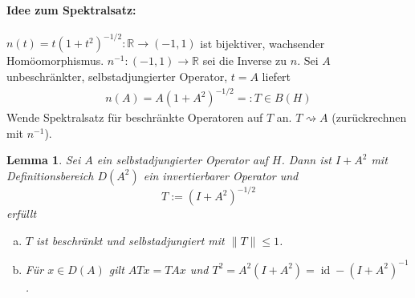 \documentclass[12pt]{extreport} %
\newtheorem{Lemma}[Satz]{Lemma}
\DeclareMathOperator{\id}{id}
\numberwithin{equation}{section}
\newcommand{\R}{\mathbb{R}} %
\begin{document}
\paragraph{Idee zum Spektralsatz:}
$n(t) = t(1+t^2)^{-1/2}\colon\R\rightarrow (-1,1)$ ist bijektiver, wachsender Homöomorphismus. $n^{-1}\colon (-1,1)\rightarrow \R$ sei die Inverse zu $n$. Sei $A$ unbeschränkter, selbstadjungierter Operator, $t = A$ liefert
\begin{align*}
	n(A) = A(1 + A^2)^{-1/2} =: T\in B(H)
\end{align*}
Wende Spektralsatz für beschränkte Operatoren auf $T$ an. $T\rightsquigarrow A$ (zurückrechnen mit $n^{-1}$).

\begin{Lemma}
	Sei $A$ ein selbstadjungierter Operator auf $H$. Dann ist $I+A^2$ mit Definitionsbereich $D(A^2)$ ein invertierbarer Operator und 
	$$T := (I+A^2)^{-1/2}$$
	erfüllt
	\begin{enumerate}[a)]
		\item $T$ ist beschränkt und selbstadjungiert mit $\|T\| \leq 1$.
		\item Für $x\in D(A)$ gilt $ATx = TAx$ und $T^2 = A^2(I+A^2) = \id-(I+A^2)^{-1}$.
	\end{enumerate}
\end{Lemma}
\end{document}
